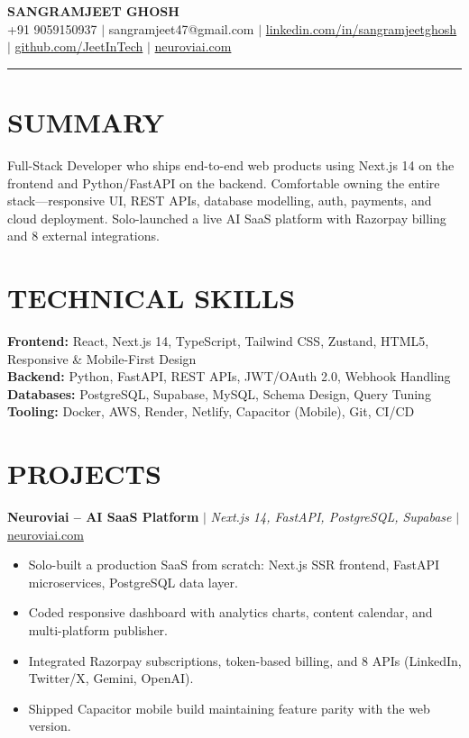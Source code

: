 \documentclass[10pt]{article}
\begin{document}
\begin{center}
{\Large \textbf{SANGRAMJEET GHOSH}} \\[2pt]
{\small +91 9059150937 $|$ sangramjeet47@gmail.com $|$
\href{https://www.linkedin.com/in/sangramjeetghosh}{linkedin.com/in/sangramjeetghosh} $|$
\href{https://github.com/JeetInTech}{github.com/JeetInTech} $|$
\href{https://neuroviai.com}{neuroviai.com}}
\end{center}

\noindent\rule{\textwidth}{0.4pt}

\section*{SUMMARY}
Full-Stack Developer who ships end-to-end web products using Next.js 14 on the frontend and Python/FastAPI on the backend. Comfortable owning the entire stack---responsive UI, REST APIs, database modelling, auth, payments, and cloud deployment. Solo-launched a live AI SaaS platform with Razorpay billing and 8 external integrations.

\section*{TECHNICAL SKILLS}
\textbf{Frontend:} React, Next.js 14, TypeScript, Tailwind CSS, Zustand, HTML5, Responsive \& Mobile-First Design \\
\textbf{Backend:} Python, FastAPI, REST APIs, JWT/OAuth 2.0, Webhook Handling \\
\textbf{Databases:} PostgreSQL, Supabase, MySQL, Schema Design, Query Tuning \\
\textbf{Tooling:} Docker, AWS, Render, Netlify, Capacitor (Mobile), Git, CI/CD

\section*{PROJECTS}
\textbf{Neuroviai -- AI SaaS Platform} $|$ \textit{Next.js 14, FastAPI, PostgreSQL, Supabase} $|$ \href{https://neuroviai.com}{neuroviai.com}
\begin{itemize}
\item Solo-built a production SaaS from scratch: Next.js SSR frontend, FastAPI microservices, PostgreSQL data layer.
\item Coded responsive dashboard with analytics charts, content calendar, and multi-platform publisher.
\item Integrated Razorpay subscriptions, token-based billing, and 8 APIs (LinkedIn, Twitter/X, Gemini, OpenAI).
\item Shipped Capacitor mobile build maintaining feature parity with the web version.
\end{itemize}
\end{document}
